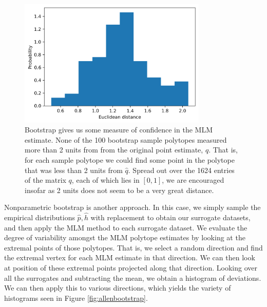 \begin{figure}
\includegraphics[width=0.8\textwidth]{pics/allenbootstrap}
\caption{Bootstrap gives us some measure of confidence in the MLM estimate.  None of the 100 bootstrap sample polytopes measured more than 2 units from from the original point estimate, $\hat q$.  That is, for each sample polytope we could find some point in the polytope that was less than 2 units from $\hat q$.  Spread out over the 1624 entries of the matrix $q$, each of which lies in $[0,1]$, we are encouraged insofar as 2 units does not seem to be a very great distance.  \label{fig:bootstrap}}
\end{figure}

Nonparametric bootstrap is another approach.  In this case, we simply sample the empirical distributions $\hat p,\hat h$ with replacement to obtain our surrogate datasets, and then apply the MLM method to each surrogate dataset.  We evaluate the degree of variability amongst the MLM polytope estimates by looking at the extremal points of those polytopes.  That is, we select a random direction and find the extremal vertex for each MLM estimate in that direction.  We can then look at position of these extremal points projected along that direction.  Looking over all the surrogates and subtracting the mean, we obtain a histogram of deviations.  We can then apply this to various directions, which yields the variety of histograms seen in Figure \ref{fig:allenbootstrap}.   

